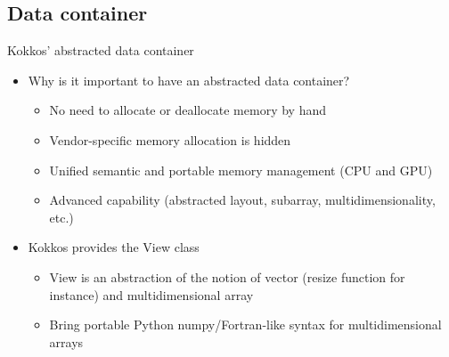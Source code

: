 \documentclass[aspectratio=169]{beamer}
\begin{document}

\subsection[Data container]{Data container}


\begin{frame}[fragile]{Kokkos' abstracted data container}
    \begin{itemize}
        \item Why is it important to have an abstracted data container?
        \begin{itemize}
            \item No need to allocate or deallocate memory by hand
            \item Vendor-specific memory allocation is hidden
            \item Unified semantic and portable memory management (CPU and GPU)
            \item Advanced capability (abstracted layout, subarray, multidimensionality, etc.)
        \end{itemize}
        \item Kokkos provides the View class
        \begin{itemize}
            \item View is an abstraction of the notion of vector (resize function for instance) and multidimensional array
            \item Bring portable Python numpy/Fortran-like syntax for multidimensional arrays
        \end{itemize}
    \end{itemize}
\end{frame}

\end{document}
